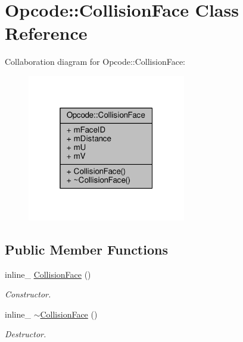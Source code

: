 \hypertarget{classOpcode_1_1CollisionFace}{}\section{Opcode\+:\+:Collision\+Face Class Reference}
\label{classOpcode_1_1CollisionFace}


Collaboration diagram for Opcode\+:\+:Collision\+Face\+:
\nopagebreak
\begin{figure}[H]
\begin{center}
\leavevmode
\includegraphics[width=196pt]{d8/de2/classOpcode_1_1CollisionFace__coll__graph}
\end{center}
\end{figure}
\subsection*{Public Member Functions}
\begin{DoxyCompactItemize}
\item 
inline\+\_\+ \hyperlink{classOpcode_1_1CollisionFace_a02655c12d6dfd5ca4523d2f08a0e5ced}{Collision\+Face} ()\hypertarget{classOpcode_1_1CollisionFace_a02655c12d6dfd5ca4523d2f08a0e5ced}{}\label{classOpcode_1_1CollisionFace_a02655c12d6dfd5ca4523d2f08a0e5ced}

\begin{DoxyCompactList}\small\item\em Constructor. \end{DoxyCompactList}\item 
inline\+\_\+ \hyperlink{classOpcode_1_1CollisionFace_ae4faa48100a3c8ea40bb1b0b085ece69}{$\sim$\+Collision\+Face} ()\hypertarget{classOpcode_1_1CollisionFace_ae4faa48100a3c8ea40bb1b0b085ece69}{}\label{classOpcode_1_1CollisionFace_ae4faa48100a3c8ea40bb1b0b085ece69}

\begin{DoxyCompactList}\small\item\em Destructor. \end{DoxyCompactList}\end{DoxyCompactItemize}
